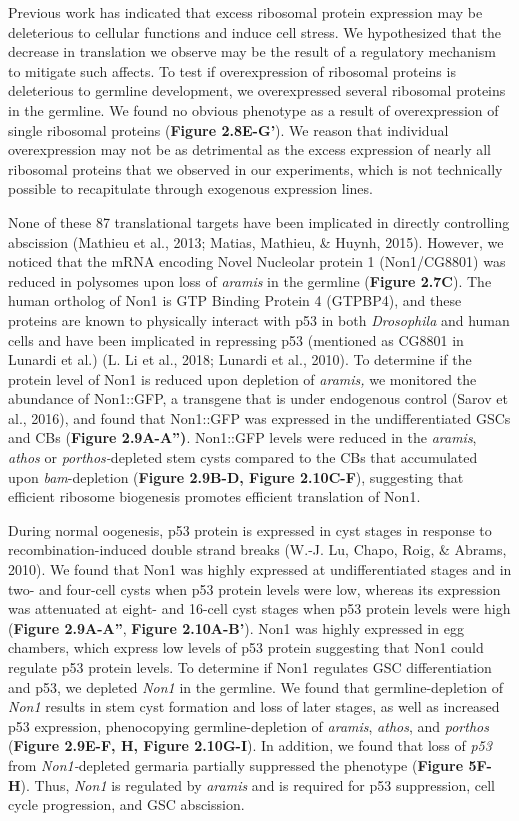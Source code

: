 \documentclass[12pt,oneside]{reedthesis}
\begin{document}
Previous work has indicated that excess ribosomal protein expression may
be deleterious to cellular functions and induce cell stress. We
hypothesized that the decrease in translation we observe may be the
result of a regulatory mechanism to mitigate such affects. To test if
overexpression of ribosomal proteins is deleterious to germline
development, we overexpressed several ribosomal proteins in the
germline. We found no obvious phenotype as a result of overexpression of
single ribosomal proteins (\textbf{Figure 2.8E-G'}). We reason that individual
overexpression may not be as detrimental as the excess expression of
nearly all ribosomal proteins that we observed in our experiments, which
is not technically possible to recapitulate through exogenous expression
lines.

None of these 87 translational targets have been implicated in directly
controlling abscission (Mathieu et al., 2013; Matias, Mathieu, \& Huynh, 2015). However, we
noticed that the mRNA encoding Novel Nucleolar protein 1 (Non1/CG8801)
was reduced in polysomes upon loss of \emph{aramis} in the germline (\textbf{Figure 2.7C}).
The human ortholog of Non1 is GTP Binding Protein 4 (GTPBP4), and
these proteins are known to physically interact with p53 in both
\emph{Drosophila} and human cells and have been implicated in repressing p53
(mentioned as CG8801 in Lunardi et al.) (L. Li et al., 2018; Lunardi et al., 2010).
To determine if the protein level of Non1 is reduced upon depletion of
\emph{aramis,} we monitored the abundance of Non1::GFP, a transgene that is
under endogenous control (Sarov et al., 2016), and
found that Non1::GFP was expressed in the undifferentiated GSCs and CBs
(\textbf{Figure 2.9A-A'')}. Non1::GFP levels were reduced in the \emph{aramis},
\emph{athos} or \emph{porthos-}depleted stem cysts compared to the CBs that
accumulated upon \emph{bam}-depletion (\textbf{Figure 2.9B-D, Figure 2.10C-F}),
suggesting that efficient ribosome biogenesis promotes efficient
translation of Non1.

During normal oogenesis, p53 protein is expressed in cyst stages in
response to recombination-induced double strand breaks
(W.-J. Lu, Chapo, Roig, \& Abrams, 2010). We found that Non1 was highly
expressed at undifferentiated stages and in two- and four-cell cysts
when p53 protein levels were low, whereas its expression was attenuated
at eight- and 16-cell cyst stages when p53 protein levels were high
(\textbf{Figure 2.9A-A''}, \textbf{Figure 2.10A-B'}). Non1 was highly expressed in egg
chambers, which express low levels of p53 protein suggesting that Non1
could regulate p53 protein levels. To determine if Non1 regulates GSC
differentiation and p53, we depleted \emph{Non1} in the germline. We found
that germline-depletion of \emph{Non1} results in stem cyst formation and
loss of later stages, as well as increased p53 expression, phenocopying
germline-depletion of \emph{aramis}, \emph{athos}, and \emph{porthos} (\textbf{Figure 2.9E-F, H, Figure 2.10G-I}). In addition, we found that loss of \emph{p53} from
\emph{Non1-}depleted germaria partially suppressed the phenotype (\textbf{Figure
5F-H}). Thus, \emph{Non1} is regulated by \emph{aramis} and is required for p53
suppression, cell cycle progression, and GSC abscission.
\end{document}
